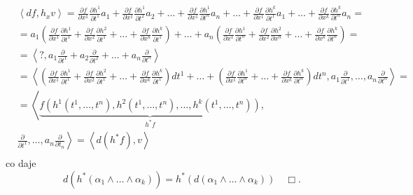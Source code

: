 \documentclass[../main.tex]{subfiles}
\begin{document}
\begin{align*}
&\left<df, h_xv \right> = \frac{\partial f}{\partial x^1} \frac{\partial h^1}{\partial t^1} a_1 + \frac{\partial f}{\partial x^1} \frac{\partial h^1}{\partial t^2} a_2 + \ldots + \frac{\partial f}{\partial x^1} \frac{\partial h^1}{\partial t^n} a_n + \ldots + \frac{\partial f}{\partial x^1} \frac{\partial h^k}{\partial t^1} a_1 + \ldots + \frac{\partial f}{\partial x^k} \frac{\partial h^k}{\partial t^n} a_n = \\
&= a_1 \left( \frac{\partial f}{\partial x^1} \frac{\partial h^1}{\partial t^1} + \frac{\partial f}{\partial x^2} \frac{\partial h^2}{\partial t^1} + \ldots + \frac{\partial f}{\partial x^k} \frac{\partial h^k}{\partial t^1} \right) + \ldots + a_n \left( \frac{\partial f}{\partial x^1} \frac{\partial h^1}{\partial t^n} + \frac{\partial f}{\partial x^2} \frac{\partial h^2}{\partial x^n} + \ldots + \frac{\partial f}{\partial x^k} \frac{\partial h^k}{\partial t^n}  \right) = \\
&= \left< ?, a_1 \frac{\partial }{\partial t^1} + a_2 \frac{\partial }{\partial t^2} + \ldots + a_n \frac{\partial }{\partial t^n}  \right> \\
&= \left< \left( \frac{\partial f}{\partial x^1} \frac{\partial h^1}{\partial t^1} + \frac{\partial f}{\partial x^2} \frac{\partial h^2}{\partial t^1} + \ldots + \frac{\partial f}{\partial x^k} \frac{\partial h^k}{\partial t^1}\right)dt^1 + \ldots + \left( \frac{\partial f}{\partial x^1} \frac{\partial h^1}{\partial t^n} + \ldots + \frac{\partial f}{\partial x^k} \frac{\partial h^k}{\partial t^n}  \right) dt^n , a_1 \frac{\partial }{\partial t^1} , \ldots, a_n \frac{\partial }{\partial t^n}  \right> = \\
&= \left< \underbrace{f\left(h^1(t^1,\ldots, t^n), h^2(t^1,\ldots,t^n), \ldots, h^k(t^1,\ldots,t^n)\right)}_{h^*f} \right.,  \\
&\left. \frac{\partial }{\partial t^1} ,\ldots,a_n \frac{\partial }{\partial t_n}\right> = \left<d\left( h^*f \right) , v \right> \\
\end{align*}
co daje
\[
    d\left( h^*(\alpha_1\land\ldots\land \alpha_k) \right) = h^* \left( d\left( \alpha_1\land\ldots\land \alpha_k \right)  \right) \quad\Box
.\]
\end{document}
